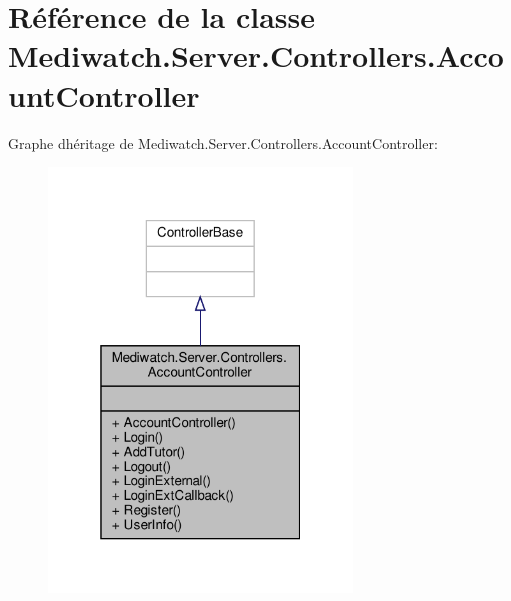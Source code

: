 \hypertarget{class_mediwatch_1_1_server_1_1_controllers_1_1_account_controller}{}\section{Référence de la classe Mediwatch.\+Server.\+Controllers.\+Account\+Controller}
\label{class_mediwatch_1_1_server_1_1_controllers_1_1_account_controller}


Graphe d\textquotesingle{}héritage de Mediwatch.\+Server.\+Controllers.\+Account\+Controller\+:
\nopagebreak
\begin{figure}[H]
\begin{center}
\leavevmode
\includegraphics[width=229pt]{class_mediwatch_1_1_server_1_1_controllers_1_1_account_controller__inherit__graph}
\end{center}
\end{figure}


